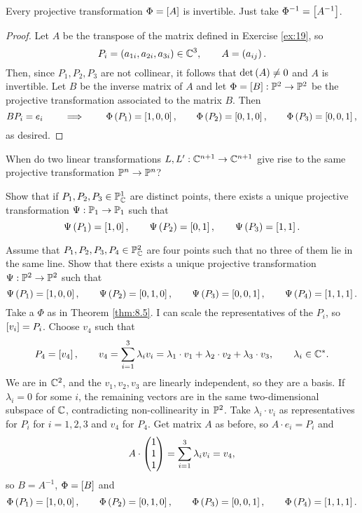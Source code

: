 \begin{remark*}
Every projective transformation $ \Phi = \sb{A} $ is invertible. Just take $ \Phi^{-1} = \sb{A^{-1}} $.
\end{remark*}

\begin{proof}
Let $ A $ be the transpose of the matrix defined in Exercise \ref{ex:19}, so
$$ P_i = \rb{a_{1i}, a_{2i}, a_{3i}} \in \C^3, \qquad A = \rb{a_{ij}}. $$
Then, since $ P_1, P_2, P_3 $ are not collinear, it follows that $ \det\rb{A} \ne 0 $ and $ A $ is invertible. Let $ B $ be the inverse matrix of $ A $ and let $ \Phi = \sb{B} : \P^2 \to \P^2 $ be the projective transformation associated to the matrix $ B $. Then
$$ BP_i = e_i \qquad \implies \qquad \Phi\rb{P_1} = \sb{1, 0, 0}, \qquad \Phi\rb{P_2} = \sb{0, 1, 0}, \qquad \Phi\rb{P_3} = \sb{0, 0, 1}, $$
as desired.
\end{proof}

\begin{exercise}
When do two linear transformations $ L, L' : \C^{n + 1} \to \C^{n + 1} $ give rise to the same projective transformation $ \P^n \to \P^n $?
\end{exercise}

\begin{exercise}
Show that if $ P_1, P_2, P_3 \in \P^1_\C $ are distinct points, there exists a unique projective transformation $ \Psi : \P_1 \to \P_1 $ such that
$$ \Psi\rb{P_1} = \sb{1, 0}, \qquad \Psi\rb{P_2} = \sb{0, 1}, \qquad \Psi\rb{P_3} = \sb{1, 1}. $$
\end{exercise}

\begin{exercise}
Assume that $ P_1, P_2, P_3, P_4 \in \P^2_\C $ are four points such that no three of them lie in the same line. Show that there exists a unique projective transformation $ \Psi : \P^2 \to \P^2 $ such that
$$ \Psi\rb{P_1} = \sb{1, 0, 0}, \qquad \Psi\rb{P_2} = \sb{0, 1, 0}, \qquad \Psi\rb{P_3} = \sb{0, 0, 1}, \qquad \Psi\rb{P_4} = \sb{1, 1, 1}. $$
Take a $ \Phi $ as in Theorem \ref{thm:8.5}. I can scale the representatives of the $ P_i $, so $ \sb{v_i} = P_i $. Choose $ v_4 $ such that
$$ P_4 = \sb{v_4}, \qquad v_4 = \sum_{i = 1}^3 \lambda_i v_i = \lambda_1 \cdot v_1 + \lambda_2 \cdot v_2 + \lambda_3 \cdot v_3, \qquad \lambda_i \in \C^*. $$
We are in $ \C^2 $, and the $ v_1, v_2, v_3 $ are linearly independent, so they are a basis. If $ \lambda_i = 0 $ for some $ i $, the remaining vectors are in the same two-dimensional subspace of $ \C $, contradicting non-collinearity in $ \P^2 $. Take $ \lambda_i \cdot v_i $ as representatives for $ P_i $ for $ i = 1, 2, 3 $ and $ v_4 $ for $ P_4 $. Get matrix $ A $ as before, so $ A \cdot e_i = P_i $ and
$$ A \cdot \threebyone{1}{1}{1} = \sum_{i = 1}^3 \lambda_iv_i = v_4, $$
so $ B = A^{-1} $, $ \Phi = \sb{B} $ and
$$ \Phi\rb{P_1} = \sb{1, 0, 0}, \qquad \Phi\rb{P_2} = \sb{0, 1, 0}, \qquad \Phi\rb{P_3} = \sb{0, 0, 1}, \qquad \Phi\rb{P_4} = \sb{1, 1, 1}. $$
\end{exercise}

